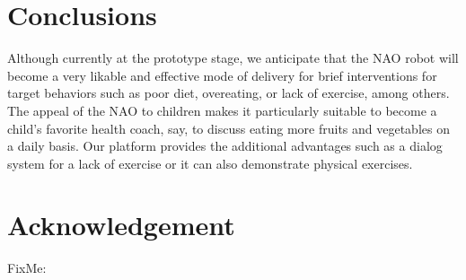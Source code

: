 \documentclass[letterpaper]{article}
\begin{document}
\section*{Conclusions} 

Although currently at the prototype stage, we anticipate that the NAO robot will become a very 
likable and effective mode of delivery for brief interventions for target behaviors such as poor 
diet, overeating, or lack of exercise, among others.  The appeal of the NAO to children 
\cite{belpaeme2012multimodal} makes it particularly suitable to become a child's favorite health 
coach, say, to discuss eating more fruits and vegetables on a daily basis. Our platform 
provides the additional advantages such as a dialog system for a lack of exercise or  it can 
also demonstrate physical exercises.


\section*{Acknowledgement}
{\color{red}
FixMe:
}

       
   
\end{document}
